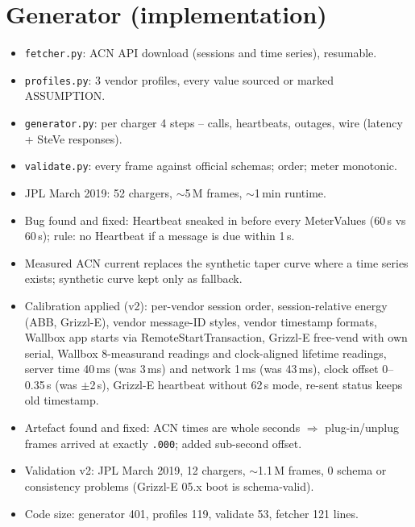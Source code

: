 \documentclass[11pt]{article}
\begin{document}
\section{Generator (implementation)}
\begin{itemize}
  \item \texttt{fetcher.py}: ACN API download (sessions and time series), resumable.
  \item \texttt{profiles.py}: 3 vendor profiles, every value sourced or marked ASSUMPTION.
  \item \texttt{generator.py}: per charger 4 steps -- calls, heartbeats, outages, wire (latency + SteVe responses).
  \item \texttt{validate.py}: every frame against official schemas; order; meter monotonic.
  \item JPL March 2019: 52 chargers, $\sim$5\,M frames, $\sim$1\,min runtime.
  \item Bug found and fixed: Heartbeat sneaked in before every MeterValues (60\,s vs 60\,s); rule: no Heartbeat if a message is due within 1\,s.
  \item Measured ACN current replaces the synthetic taper curve where a time series exists; synthetic curve kept only as fallback.
  \item Calibration applied (v2): per-vendor session order, session-relative energy (ABB, Grizzl-E), vendor message-ID styles, vendor timestamp formats, Wallbox app starts via RemoteStartTransaction, Grizzl-E free-vend with own serial, Wallbox 8-measurand readings and clock-aligned lifetime readings, server time 40\,ms (was 3\,ms) and network 1\,ms (was 43\,ms), clock offset 0--0.35\,s (was $\pm$2\,s), Grizzl-E heartbeat without 62\,s mode, re-sent status keeps old timestamp.
  \item Artefact found and fixed: ACN times are whole seconds $\Rightarrow$ plug-in/unplug frames arrived at exactly \texttt{.000}; added sub-second offset.
  \item Validation v2: JPL March 2019, 12 chargers, $\sim$1.1\,M frames, 0 schema or consistency problems (Grizzl-E 05.x boot is schema-valid).
  \item Code size: generator 401, profiles 119, validate 53, fetcher 121 lines.
\end{itemize}
\end{document}

